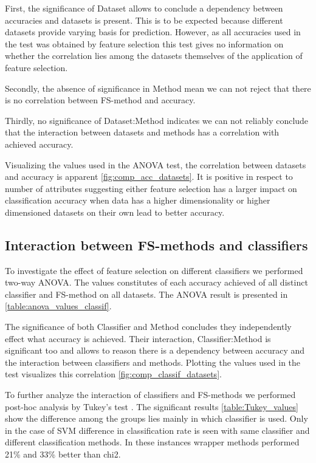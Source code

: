 First, the significance of Dataset allows to conclude a dependency between accuracies and datasets is present. This is to be expected because different datasets provide varying basis for prediction. However, as all accuracies used in the test was obtained by feature selection this test gives no information on whether the correlation lies among the datasets themselves of the application of feature selection.

Secondly, the absence of significance in Method mean we can not reject that there is no correlation between FS-method and accuracy.

Thirdly, no significance of Dataset:Method indicates we can not reliably conclude that the interaction between datasets and methods has a correlation with achieved accuracy.

Visualizing the values used in the ANOVA test, the correlation between datasets and accuracy is apparent \ref{fig:comp_acc_datasets}. It is positive in respect to number of attributes suggesting either feature selection has a larger impact on classification accuracy when data has a higher dimensionality or higher dimensioned datasets on their own lead to better accuracy.



\subsection{Interaction between FS-methods and classifiers}
\label{sec:fs_methods_classifiers}

To investigate the effect of feature selection on different classifiers we performed two-way ANOVA. The values constitutes of each accuracy achieved of all distinct classifier and FS-method on all datasets. The ANOVA result is presented in \ref{table:anova_values_classif}.



The significance of both Classifier and Method concludes they independently effect what accuracy is achieved. Their interaction, Classifier:Method is significant too and allows to reason there is a dependency between accuracy and the interaction between classifiers and methods. Plotting the values used in the test visualizes this correlation \ref{fig:comp_classif_datasets}.

To further analyze the interaction of classifiers and FS-methods we performed post-hoc analysis by Tukey's test \parencite{Haynes2013}. The significant results \ref{table:Tukey_values} show the difference among the groups lies mainly in which classifier is used. Only in the case of SVM difference in classification rate is seen with same classifier and different classification methods. In these instances wrapper methods performed 21\% and 33\% better than chi2.

